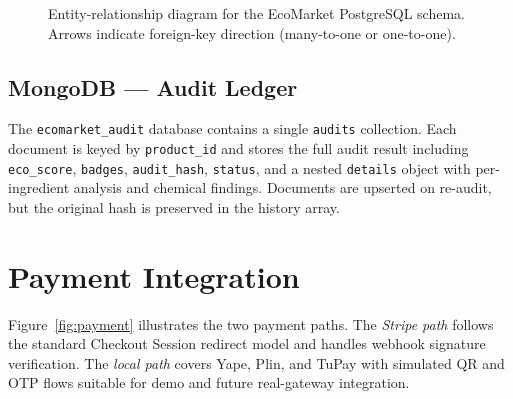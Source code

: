 \documentclass[10pt,a4paper,twocolumn]{article}
\begin{document}
\begin{figure}[ht]
\caption{Entity-relationship diagram for the EcoMarket PostgreSQL schema.
  Arrows indicate foreign-key direction (many-to-one or one-to-one).}
\label{fig:erd}
\end{figure}

\subsection{MongoDB — Audit Ledger}

The \texttt{ecomarket\_audit} database contains a single
\texttt{audits} collection. Each document is keyed by
\texttt{product\_id} and stores the full audit result including
\texttt{eco\_score}, \texttt{badges}, \texttt{audit\_hash},
\texttt{status}, and a nested \texttt{details} object with
per-ingredient analysis and chemical findings. Documents are
upserted on re-audit, but the original hash is preserved
in the history array.

\section{Payment Integration}

Figure~\ref{fig:payment} illustrates the two payment paths.
The \emph{Stripe path} follows the standard Checkout Session
redirect model and handles webhook signature verification.
The \emph{local path} covers Yape, Plin, and TuPay with
simulated QR and OTP flows suitable for demo and future
real-gateway integration.
\end{document}
